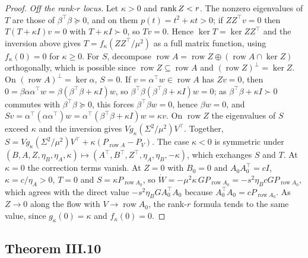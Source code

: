 \begin{proof}
\emph{Off the rank-$r$ locus.} Let $\kappa>0$ and $\operatorname{rank} Z<r$. The nonzero eigenvalues of $T$ are those of
$\beta^\top\beta\succeq0$, and on them $p(t)=t^2+\kappa t>0$; if $ZZ^\top v=0$ then $T(T+\kappa I)v=0$ with $T+\kappa I\succ0$,
so $Tv=0$. Hence $\ker T=\ker ZZ^\top$ and the inversion above gives $T=f_\kappa(ZZ^\top/\mu^2)$ as a full matrix function,
using $f_\kappa(0)=0$ for $\kappa\ge0$. For $S$, decompose $\operatorname{row}A=\operatorname{row}Z\oplus(\operatorname{row}A\cap\ker Z)$
orthogonally, which is possible since $\operatorname{row}Z\subseteq\operatorname{row}A$ and $(\operatorname{row}Z)^\perp=\ker Z$.
On $(\operatorname{row}A)^\perp=\ker\alpha$, $S=0$. If $v=\alpha^\top w\in\operatorname{row}A$ has $Zv=0$, then
$0=\beta\alpha\alpha^\top w=\beta(\beta^\top\beta+\kappa I)w$, so $\beta^\top\beta(\beta^\top\beta+\kappa I)w=0$; as
$\beta^\top\beta+\kappa I\succ0$ commutes with $\beta^\top\beta\succeq0$, this forces $\beta^\top\beta w=0$, hence $\beta w=0$,
and $Sv=\alpha^\top(\alpha\alpha^\top)w=\alpha^\top(\beta^\top\beta+\kappa I)w=\kappa v$. On $\operatorname{row}Z$ the
eigenvalues of $S$ exceed $\kappa$ and the inversion gives $Vg_\kappa(\Sigma^2/\mu^2)V^\top$. Together,
$S=Vg_\kappa(\Sigma^2/\mu^2)V^\top+\kappa(P_{\operatorname{row}A}-P_V)$. The case $\kappa<0$ is symmetric under
$(B,A,Z,\eta_B,\eta_A,\kappa)\mapsto(A^\top,B^\top,Z^\top,\eta_A,\eta_B,-\kappa)$, which exchanges $S$ and $T$. At $\kappa=0$ the correction terms vanish. At $Z=0$ with $B_0=0$
and $A_0A_0^\top=cI$, $\kappa=c/\eta_A>0$, $T=0$ and $S=\kappa P_{\operatorname{row}A_0}$, so
$\dot W=-\mu^2\kappa\,GP_{\operatorname{row}A_0}=-s^2\eta_BcGP_{\operatorname{row}A_0}$, which agrees with the direct value
$-s^2\eta_BGA_0^\top A_0$ because $A_0^\top A_0=cP_{\operatorname{row}A_0}$. As $Z\to0$ along the flow with $V\to\operatorname{row}A_0$,
the rank-$r$ formula tends to the same value, since $g_\kappa(0)=\kappa$ and $f_\kappa(0)=0$.
\end{proof}

\subsection{Theorem III.10}\label{proof:III.10}

